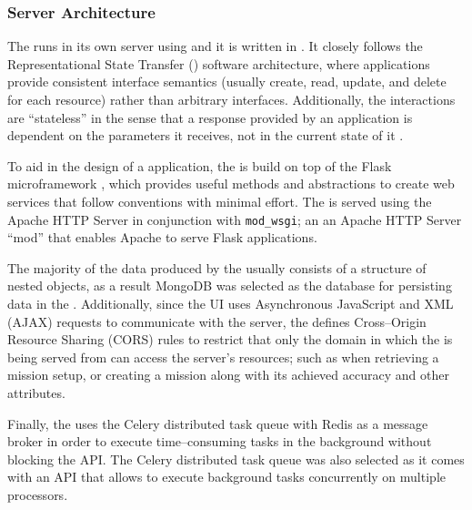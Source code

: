 \subsubsection{Server Architecture} \label{subsubsect:case-study:arch:server}

The \mlblinkapi runs in its own server using \ubuntu and it is written in \python. It closely follows the Representational State Transfer (\rest) software architecture, where applications provide consistent interface semantics (usually create, read, update, and delete for each resource) rather than arbitrary interfaces. Additionally, the \rest interactions are ``stateless'' in the sense that a response provided by an application is dependent on the parameters it receives, not in the current state of it \cite{web:w3:rest}.

To aid in the design of a \rest application, the \mlblinkapi is build on top of the Flask microframework \cite{software:flask}, which provides useful methods and abstractions to create web services that follow \rest conventions with minimal effort. The \mlblinkapi is served using the Apache HTTP Server in conjunction with \texttt{mod\_wsgi}; an an Apache HTTP Server ``mod'' that enables Apache to serve Flask applications.

The majority of the data produced by the \mlblinkui usually consists of a structure of nested objects, as a result MongoDB was selected as the database for persisting data in the \mlblinkapi. Additionally, since the UI uses Asynchronous JavaScript and XML (AJAX) requests to communicate with the server, the \mlblinkapi defines Cross--Origin Resource Sharing (CORS) rules to restrict that only the domain in which the \mlblinkui is being served from can access the server's resources; such as when retrieving a mission setup, or creating a mission along with its achieved accuracy and other attributes.

Finally, the \mlblinkapi uses the Celery distributed task queue \cite{software:celery} with Redis as a message broker in order to execute time--consuming tasks in the background without blocking the API. The Celery distributed task queue was also selected as it comes with an API that allows to execute background tasks concurrently on multiple processors.